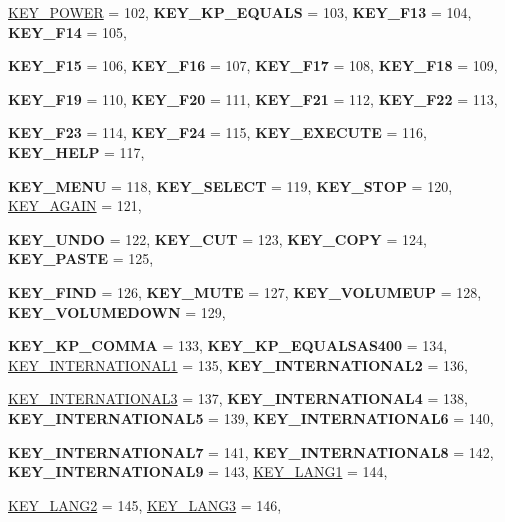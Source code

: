 \begin{DoxyCompactItemize}
\par
\hyperlink{classphys_1_1MetaCode_a3e501cbb5bf0f6f1fdb7211465bda8d8a08a2d04e3a40d746b81913e92a25a038}{KEY\_\-POWER} =  102, 
{\bfseries KEY\_\-KP\_\-EQUALS} =  103, 
{\bfseries KEY\_\-F13} =  104, 
{\bfseries KEY\_\-F14} =  105, 
\par
{\bfseries KEY\_\-F15} =  106, 
{\bfseries KEY\_\-F16} =  107, 
{\bfseries KEY\_\-F17} =  108, 
{\bfseries KEY\_\-F18} =  109, 
\par
{\bfseries KEY\_\-F19} =  110, 
{\bfseries KEY\_\-F20} =  111, 
{\bfseries KEY\_\-F21} =  112, 
{\bfseries KEY\_\-F22} =  113, 
\par
{\bfseries KEY\_\-F23} =  114, 
{\bfseries KEY\_\-F24} =  115, 
{\bfseries KEY\_\-EXECUTE} =  116, 
{\bfseries KEY\_\-HELP} =  117, 
\par
{\bfseries KEY\_\-MENU} =  118, 
{\bfseries KEY\_\-SELECT} =  119, 
{\bfseries KEY\_\-STOP} =  120, 
\hyperlink{classphys_1_1MetaCode_a3e501cbb5bf0f6f1fdb7211465bda8d8a7e4a4d24f9b7d3cb3695c9419c5aed4a}{KEY\_\-AGAIN} =  121, 
\par
{\bfseries KEY\_\-UNDO} =  122, 
{\bfseries KEY\_\-CUT} =  123, 
{\bfseries KEY\_\-COPY} =  124, 
{\bfseries KEY\_\-PASTE} =  125, 
\par
{\bfseries KEY\_\-FIND} =  126, 
{\bfseries KEY\_\-MUTE} =  127, 
{\bfseries KEY\_\-VOLUMEUP} =  128, 
{\bfseries KEY\_\-VOLUMEDOWN} =  129, 
\par
{\bfseries KEY\_\-KP\_\-COMMA} =  133, 
{\bfseries KEY\_\-KP\_\-EQUALSAS400} =  134, 
\hyperlink{classphys_1_1MetaCode_a3e501cbb5bf0f6f1fdb7211465bda8d8a47fe3fc087358b7166c1f1ce71effdc9}{KEY\_\-INTERNATIONAL1} =  135, 
{\bfseries KEY\_\-INTERNATIONAL2} =  136, 
\par
\hyperlink{classphys_1_1MetaCode_a3e501cbb5bf0f6f1fdb7211465bda8d8a1dce5180d021f3ef331d8c2ed6fd164c}{KEY\_\-INTERNATIONAL3} =  137, 
{\bfseries KEY\_\-INTERNATIONAL4} =  138, 
{\bfseries KEY\_\-INTERNATIONAL5} =  139, 
{\bfseries KEY\_\-INTERNATIONAL6} =  140, 
\par
{\bfseries KEY\_\-INTERNATIONAL7} =  141, 
{\bfseries KEY\_\-INTERNATIONAL8} =  142, 
{\bfseries KEY\_\-INTERNATIONAL9} =  143, 
\hyperlink{classphys_1_1MetaCode_a3e501cbb5bf0f6f1fdb7211465bda8d8a1df9a42e248457bd4d1db9a71e2a3373}{KEY\_\-LANG1} =  144, 
\par
\hyperlink{classphys_1_1MetaCode_a3e501cbb5bf0f6f1fdb7211465bda8d8ae506391384523e15a1a046f8d180b628}{KEY\_\-LANG2} =  145, 
\hyperlink{classphys_1_1MetaCode_a3e501cbb5bf0f6f1fdb7211465bda8d8a61885d98887d71cb6efeace8e2a635b8}{KEY\_\-LANG3} =  146, 

\end{DoxyCompactItemize}

